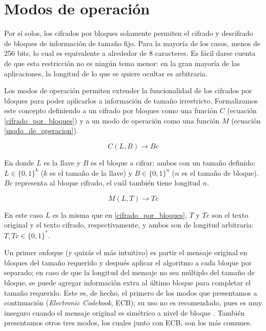 %
%

\newpage
\section{Modos de operación}

Por sí solos, los cifrados por bloques solamente permiten el cifrado y
descifrado de bloques de información de tamaño fijo. Para la mayoría de los
casos, menos de 256 bits\cite{modos_de_operacion}, lo cual es equivalente a
alrededor de 8 caracteres. Es fácil darse cuenta de que esta restricción no
es ningún tema menor: en la gran mayoría de las aplicaciones, la longitud de
lo que se quiere ocultar es arbitraria.

Los modos de operación permiten extender la funcionalidad de los cifrados por
bloques para poder aplicarlos a información de tamaño irrestricto. Formalizamos
este concepto definiendo a un cifrado por bloques como una función $ C $
(ecuación \ref{cifrado_por_bloques}) y a un modo de operación como una función
$ M $ (ecuación \ref{modo_de_operacion}).

\begin{equation}
  \label{cifrado_por_bloques}
  C(L, B) \rightarrow Bc
\end{equation}

En donde $ L $ es la llave y $ B $ es el bloque a cifrar; ambos con un tamaño
definido: $ L \in \{0, 1\}^k $ ($ k $ es el tamaño de la llave) y
$ B \in \{0, 1\}^n $ ($ n $ es el tamaño de bloque). $ Bc $ representa al
bloque cifrado, el cuál también tiene longitud $ n $.

\begin{equation}
  \label{modo_de_operacion}
  M(L, T) \rightarrow Tc
\end{equation}

En este caso $ L $ es la misma que en \ref{cifrado_por_bloques}, $ T $ y
$ Tc $ son el texto original y el texto cifrado, respectivamente, y ambos
son de longitud arbitraria: $ T, Tc \in \{0, 1\}^* $.

Un primer enfoque (y quizás el más intuitivo) es partir el mensaje original
en bloques del tamaño requerido y después aplicar el algoritmo a cada bloque
por separado; en caso de que la longitud del mensaje no sea múltiplo del
tamaño de bloque, se puede agregar información extra al último bloque para
completar el tamaño requerido. Este es, de hecho, el primero de los modos que
presentamos a continuación (\textit{Electronic Codebook}, ECB); su uso no es
recomendado, pues es muy inseguro cuando el mensaje original es simétrico a
nivel de bloque \cite{modos_de_operacion}. También presentamos otros tres
modos, los cuales junto con ECB, son los más comunes.


